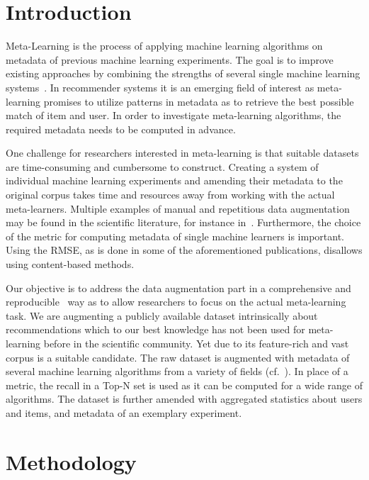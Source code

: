 \documentclass[runningheads]{llncs}
\begin{document}
\section{Introduction}
Meta-Learning is the process of applying machine learning algorithms on metadata of previous machine learning experiments. The goal is to improve existing approaches by combining the strengths of several single machine learning systems~\cite{AIR:MetalearningSurveyOfTrendsAndTechnologiesLemke2015}. In recommender systems it is an emerging field of interest as meta-learning promises to utilize patterns in metadata as to retrieve the best possible match of item and user. In order to investigate meta-learning algorithms, the required metadata needs to be computed in advance.

One challenge for researchers interested in meta-learning is that suitable datasets are time-consuming and cumbersome to construct. Creating a system of individual machine learning experiments and amending their metadata to the original corpus takes time and resources away from working with the actual meta-learners. Multiple examples of manual and repetitious data augmentation may be found in the scientific literature, for instance in~\cite{CUNHA2018128,DBLP:journals/corr/abs-1805-12118,Ekstrand:2012:RFP:2365952.2366002}. Furthermore, the choice of the metric for computing metadata of single machine learners is important. Using the RMSE, as is done in some of the aforementioned publications, disallows using content-based methods.

Our objective is to address the data augmentation part in a comprehensive and reproducible~\cite{UMUAI:TowardsReproducibilityInRecSysBeel2016} way as to allow researchers to focus on the actual meta-learning task. We are augmenting a publicly available dataset intrinsically about recommendations which to our best knowledge has not been used for meta-learning before in the scientific community. Yet due to its feature-rich and vast corpus is a suitable candidate. The raw dataset is augmented with metadata of several machine learning algorithms from a variety of fields (cf.~\cite{DBLP:journals/corr/abs-1805-12118}). In place of a metric, the recall in a Top-N set is used as it can be computed for a wide range of algorithms. The dataset is further amended with aggregated statistics about users and items, and metadata of an exemplary experiment.

\section{Methodology}
\end{document}
